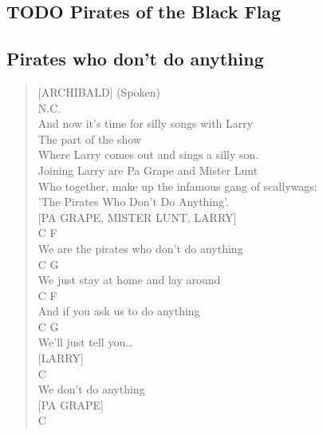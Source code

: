\documentclass[11pt]{article}
\begin{document}
\subsection{{\bfseries\sffamily TODO} Pirates of the Black Flag}
\label{sec:orgd682309}
\clearpage
\subsection{Pirates who don't do anything}
\label{sec:org93f2492}
\begin{verse}
[ARCHIBALD] (Spoken)\\
N.C.\\
And now it's time for silly songs with Larry\\
The part of the show\\
Where Larry comes out and sings a silly son.\\
\vspace*{1em}
Joining Larry are Pa Grape and Mister Lunt\\
Who together, make up the infamous gang of scallywags:\\
'The Pirates Who Don't Do Anything'.\\
\vspace*{1em}
\vspace*{1em}
[PA GRAPE, MISTER LUNT, LARRY]\\
\hspace*{11em}C                    F\\
We are the pirates who don't do anything\\
\hspace*{8em}C                    G\\
We just stay at home and lay around\\
\hspace*{11em}C            F\\
And if you ask us to do anything\\
C          G\\
We'll just tell you\ldots{}\\
\vspace*{1em}
\vspace*{1em}
[LARRY]\\
\hspace*{12em}C\\
We don't do anything\\
\vspace*{1em}
\vspace*{1em}
[PA GRAPE]\\
\hspace*{11em}C\\

\end{verse}
\end{document}
